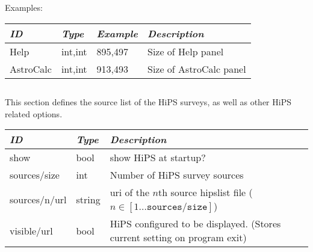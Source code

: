 Examples:

\noindent%
\begin{tabularx}{\textwidth}{l|l|l|X}
\toprule
\emph{ID}     & \emph{Type} & \emph{Example}&\emph{Description}      \\\midrule
Help          & int,int     &  895,497      & Size of Help panel     \\%
AstroCalc     & int,int     &  913,493      & Size of AstroCalc panel\\\bottomrule
\end{tabularx}


\subsection{}
\label{sec:config.ini:hips}

This section defines the source list of the HiPS surveys, as well as other
HiPS related options.

\noindent%
\begin{tabularx}{\textwidth}{l|l|X}\toprule
\emph{ID}     & \emph{Type} & \emph{Description}\\\midrule
show          & bool        & show HiPS at startup? \\
sources/size  & int         & Number of HiPS survey sources\\%
sources/n/url & string      & uri of the $n$th source hipslist file ($n \in [1 \ldots \mathtt{sources/size}]$)\\
visible/url   & bool        & HiPS configured to be displayed. (Stores current setting on program exit)\\\bottomrule
\end{tabularx}




